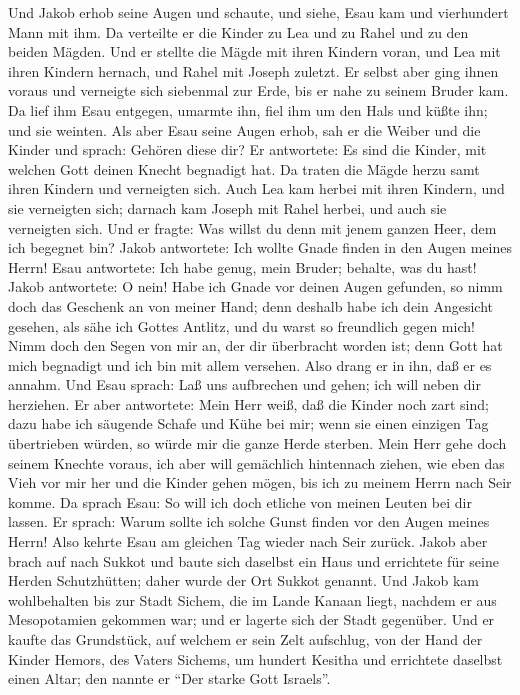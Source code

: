  Und Jakob erhob seine Augen und schaute, und siehe, Esau
kam und vierhundert Mann mit ihm. Da verteilte er die Kinder zu Lea und
zu Rahel und zu den beiden Mägden.  Und er stellte die
Mägde mit ihren Kindern voran, und Lea mit ihren Kindern hernach, und
Rahel mit Joseph zuletzt.  Er selbst aber ging ihnen
voraus und verneigte sich siebenmal zur Erde, bis er nahe zu seinem
Bruder kam.  Da lief ihm Esau entgegen, umarmte ihn, fiel
ihm um den Hals und küßte ihn; und sie weinten.  Als aber
Esau seine Augen erhob, sah er die Weiber und die Kinder und sprach:
Gehören diese dir? Er antwortete: Es sind die Kinder, mit welchen Gott
deinen Knecht begnadigt hat.  Da traten die Mägde herzu
samt ihren Kindern und verneigten sich.  Auch Lea kam
herbei mit ihren Kindern, und sie verneigten sich; darnach kam Joseph
mit Rahel herbei, und auch sie verneigten sich.  Und er
fragte: Was willst du denn mit jenem ganzen Heer, dem ich begegnet bin?
Jakob antwortete: Ich wollte Gnade finden in den Augen meines Herrn!
 Esau antwortete: Ich habe genug, mein Bruder; behalte,
was du hast!  Jakob antwortete: O nein! Habe ich Gnade
vor deinen Augen gefunden, so nimm doch das Geschenk an von meiner Hand;
denn deshalb habe ich dein Angesicht gesehen, als sähe ich Gottes
Antlitz, und du warst so freundlich gegen mich!  Nimm
doch den Segen von mir an, der dir überbracht worden ist; denn Gott hat
mich begnadigt und ich bin mit allem versehen. Also drang er in ihn, daß
er es annahm.  Und Esau sprach: Laß uns aufbrechen und
gehen; ich will neben dir herziehen.  Er aber antwortete:
Mein Herr weiß, daß die Kinder noch zart sind; dazu habe ich säugende
Schafe und Kühe bei mir; wenn sie einen einzigen Tag übertrieben würden,
so würde mir die ganze Herde sterben.  Mein Herr gehe
doch seinem Knechte voraus, ich aber will gemächlich hintennach ziehen,
wie eben das Vieh vor mir her und die Kinder gehen mögen, bis ich zu
meinem Herrn nach Seir komme.  Da sprach Esau: So will
ich doch etliche von meinen Leuten bei dir lassen. Er sprach: Warum
sollte ich solche Gunst finden vor den Augen meines Herrn!
 Also kehrte Esau am gleichen Tag wieder nach Seir
zurück.  Jakob aber brach auf nach Sukkot und baute sich
daselbst ein Haus und errichtete für seine Herden Schutzhütten; daher
wurde der Ort Sukkot genannt.  Und Jakob kam wohlbehalten
bis zur Stadt Sichem, die im Lande Kanaan liegt, nachdem er aus
Mesopotamien gekommen war; und er lagerte sich der Stadt gegenüber.
 Und er kaufte das Grundstück, auf welchem er sein Zelt
aufschlug, von der Hand der Kinder Hemors, des Vaters Sichems, um
hundert Kesitha  und errichtete daselbst einen Altar; den
nannte er ``Der starke Gott Israels''.

